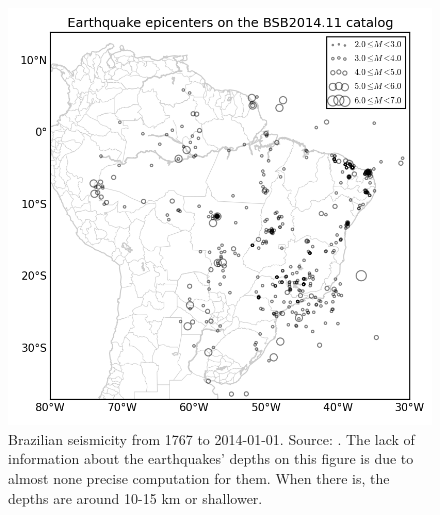 \documentclass[draft, grl]{agutex}
\begin{document}





\newpage


\begin{figure}
	\includegraphics[width=0.99\linewidth]{z_img_seismicity}
	\caption{Brazilian seismicity from 1767 to 2014-01-01. Source: \citep{bsb_2014}. The lack of information about the earthquakes' depths on this figure is due to almost none precise computation for them. When there is, the depths are around 10-15 km or shallower.}
	\label{fig_seismicity}
\end{figure}
\end{document}
